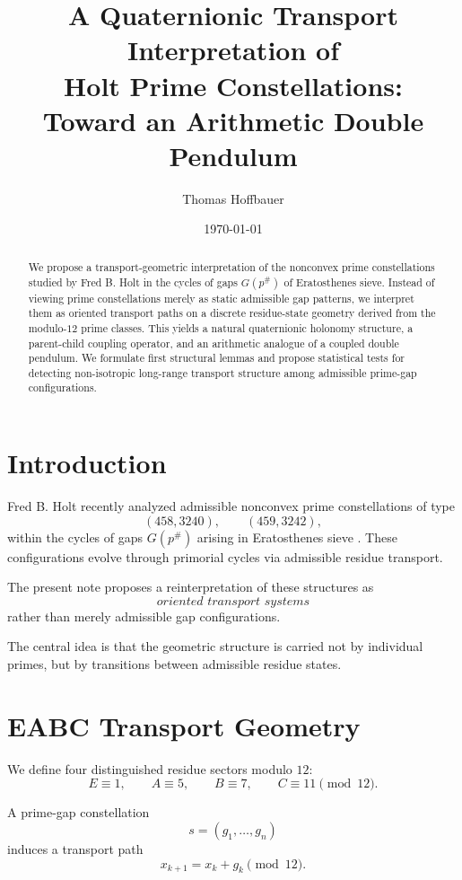 \documentclass[11pt]{article}
\title{
	A Quaternionic Transport Interpretation of\\
	Holt Prime Constellations:\\
	Toward an Arithmetic Double Pendulum
}
\author{
	Thomas Hoffbauer
}
\date{\today}
\begin{document}
	
	\maketitle
	
	\begin{abstract}
		We propose a transport-geometric interpretation of the nonconvex prime constellations studied by Fred B. Holt in the cycles of gaps $G(p^\#)$ of Eratosthenes sieve.
		Instead of viewing prime constellations merely as static admissible gap patterns, we interpret them as oriented transport paths on a discrete residue-state geometry derived from the modulo-$12$ prime classes.
		This yields a natural quaternionic holonomy structure, a parent-child coupling operator, and an arithmetic analogue of a coupled double pendulum.
		We formulate first structural lemmas and propose statistical tests for detecting non-isotropic long-range transport structure among admissible prime-gap configurations.
	\end{abstract}
	
	\section{Introduction}
	
	Fred B. Holt recently analyzed admissible nonconvex prime constellations of type
	\[
	(458,3240), \qquad (459,3242),
	\]
	within the cycles of gaps $G(p^\#)$ arising in Eratosthenes sieve \cite{holt}.
	These configurations evolve through primorial cycles via admissible residue transport.
	
	The present note proposes a reinterpretation of these structures as
	\[
	\textit{oriented transport systems}
	\]
	rather than merely admissible gap configurations.
	
	The central idea is that the geometric structure is carried not by individual primes, but by transitions between admissible residue states.
	
	\section{EABC Transport Geometry}
	
	We define four distinguished residue sectors modulo $12$:
	\[
	E \equiv 1,\qquad
	A \equiv 5,\qquad
	B \equiv 7,\qquad
	C \equiv 11
	\pmod{12}.
	\]
	
	A prime-gap constellation
	\[
	s=(g_1,\dots,g_n)
	\]
	induces a transport path
	\[
	x_{k+1}=x_k+g_k \pmod{12}.
	\]
	
\end{document}
